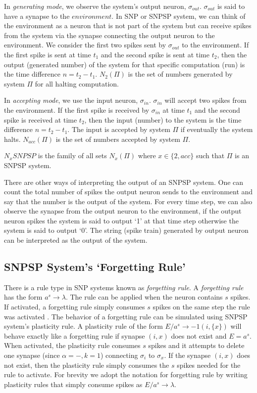\documentclass[smallextended]{svjour3}
\begin{document}
In \textit{generating mode}, we observe the system's output neuron, $\sigma_{out}$. $\sigma_{out}$ is said to have a synapse to the $
\textit{environment}$. In SNP or SNPSP system, we can think of the environment as a neuron that is not part of the system but can receive spikes
from the system via the synapse connecting the output neuron to the environment. We consider the first two spikes sent by $\sigma_{out}$ to the environment.
If the first spike is sent at time $t_1$ and the second spike is sent at time $t_2$, then the output (generated number) of the system for that 
specific computation (run) is the time difference $n=t_2-t_1$. $N_2(\Pi)$ is the set of numbers generated by system  $\Pi$ for all halting
computation.

In \textit{accepting mode}, we use the input neuron, $\sigma_{in}$. $\sigma_{in}$ will accept two spikes from the environment. If the first spike is
received by $\sigma_{in}$ at time $t_1$ and the second spike is received at time $t_2$, then the input (number) to the system is the time difference 
$n=t_2-t_1$. The input is accepted by system $\Pi$ if eventually the system halts.  $N_{acc}(\Pi)$ is the set of numbers accepted by system $\Pi$.

$N_xSNPSP$ is the family of all sets $N_x(\Pi)$ where $x \in \{2, acc\}$ such that $\Pi$ is an SNPSP system.

There are other ways of interpreting the output of an SNPSP system. One can count the total number of spikes the output neuron sends to the
environment and say that the number is the output of the system. For every time step, we can also observe the synapse from the output neuron to the
environment, if the output neuron spikes the system is said to output `1' at that time step otherwise the system is said to output `0'. The string
(spike train) generated by output neuron can be interpreted as the output of the system.


\subsection{SNPSP System's `Forgetting Rule'} \label{sec-forget}

There is a rule type in SNP systems known as \textit{forgetting rule}. A \textit{forgetting rule} has the form $a^s \rightarrow \lambda$. The rule
can be applied when the neuron contains $s$ spikes. If activated, a forgetting rule simply consumes $s$ spikes on the same step the rule was activated
. The behavior of a forgetting rule can be simulated using SNPSP system's plasticity rule. A plasticity rule of the form $E/a^s \rightarrow 
-1(i,\{x\})$ will behave exactly like a forgetting rule if synapse $(i,x)$ does not exist and $E=a^s$. When activated, the plasticity rule consumes 
$s$ spikes and it attempts to delete one synapse (since $\alpha = -, k=1$) connecting $\sigma_i$ to $\sigma_x$. If the synapse $(i,x)$ does not exist, 
then the plasticity rule simply consumes the $s$ spikes needed for the rule to activate. For brevity we adopt the notation for forgetting rule by
writing plasticity rules that simply consume spikes as $E/a^s \rightarrow \lambda$. 
\end{document}
